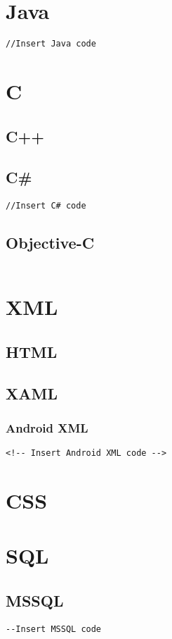 









\newpage
\section{Java}
\begin{lstlisting}[style = Java]
//Insert Java code
\end{lstlisting}
\newpage
\section{C}
\newpage
\subsection{C++}
\newpage
\subsection{C\#}
\begin{lstlisting}[style = CSharp]
//Insert C# code
\end{lstlisting}
\newpage
\subsection{Objective-C}
\begin{lstlisting}

\end{lstlisting}
\newpage
\section{XML}
\newpage
\subsection{HTML}
\newpage
\subsection{XAML}
\newpage
\subsubsection{Android XML}
\begin{lstlisting}[style = AndroidXML]
<!-- Insert Android XML code -->
\end{lstlisting}
\newpage
\section{CSS}
\newpage
\section{SQL}
\subsection{MSSQL}
\begin{lstlisting}[style = MSSQL]
--Insert MSSQL code
\end{lstlisting}
